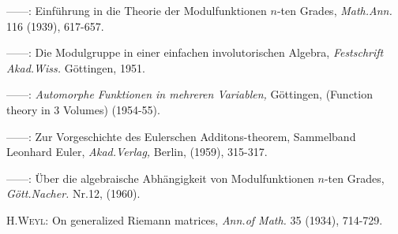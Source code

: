 \begin{thebibliography}{99}
 ------: Einf\"uhrung in die Theorie der Modulfunktionen
  $n$-ten Grades, {\em Math.\@ Ann.} 116 (1939), 617-657.

 ------: Die Modulgruppe in einer einfachen
  involutorischen Algebra, {\em Festschrift Akad.\@ Wiss.}
  G\"ottingen, 1951.

 ------: {\em Automorphe Funktionen in mehreren
  Variablen,} G\"ottingen, (Function theory in 3 Volumes) (1954-55).

 ------: Zur Vorgeschichte des Eulerschen
  Additons-theorem, Sammelband Leonhard Euler, {\em Akad.\@ Verlag,}
  Berlin, (1959), 315-317.

 ------: \"Uber die algebraische Abh\"angigkeit von
  Modulfunktionen $n$-ten Grades, {\em G\"ott.\@ Nacher.} Nr.\@ 12, (1960).

 \textsc{H.\@ Weyl:} On generalized Riemann matrices, {\em
  Ann.\@ of Math.} 35 (1934), 714-729.
\end{thebibliography}
